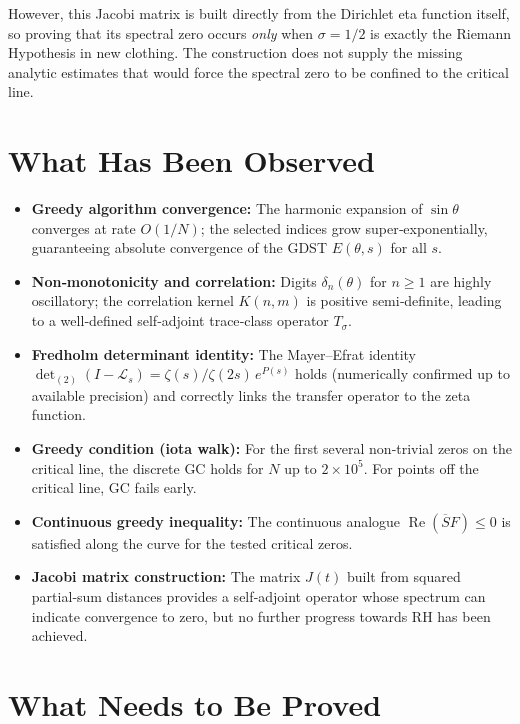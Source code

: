 \documentclass[11pt,a4paper]{article}
\newcommand{\RE}{\operatorname{Re}}
\begin{document}
However, this Jacobi matrix is built directly from the Dirichlet eta function itself, so proving that its spectral zero occurs \emph{only} when \(\sigma=1/2\) is exactly the Riemann Hypothesis in new clothing.  The construction does not supply the missing analytic estimates that would force the spectral zero to be confined to the critical line.

\section{What Has Been Observed}
\label{sec:observed}

\begin{itemize}[nosep]
	\item \textbf{Greedy algorithm convergence:} The harmonic expansion of \(\sin\theta\) converges at rate \(O(1/N)\); the selected indices grow super‑exponentially, guaranteeing absolute convergence of the GDST \(E(\theta,s)\) for all \(s\).
	\item \textbf{Non‑monotonicity and correlation:} Digits \(\delta_n(\theta)\) for \(n\ge1\) are highly oscillatory; the correlation kernel \(K(n,m)\) is positive semi‑definite, leading to a well‑defined self‑adjoint trace‑class operator \(T_\sigma\).
	\item \textbf{Fredholm determinant identity:} The Mayer–Efrat identity \(\det_{(2)}(I-\mathcal{L}_s)=\zeta(s)/\zeta(2s)\,e^{P(s)}\) holds (numerically confirmed up to available precision) and correctly links the transfer operator to the zeta function.
	\item \textbf{Greedy condition (iota walk):} For the first several non‑trivial zeros on the critical line, the discrete GC holds for \(N\) up to \(2\times10^5\).  For points off the critical line, GC fails early.
	\item \textbf{Continuous greedy inequality:} The continuous analogue \(\RE(\overline{S}F)\le0\) is satisfied along the curve for the tested critical zeros.
	\item \textbf{Jacobi matrix construction:} The matrix \(J(t)\) built from squared partial‑sum distances provides a self‑adjoint operator whose spectrum can indicate convergence to zero, but no further progress towards RH has been achieved.
\end{itemize}

\section{What Needs to Be Proved}
\label{sec:needs}
\end{document}
